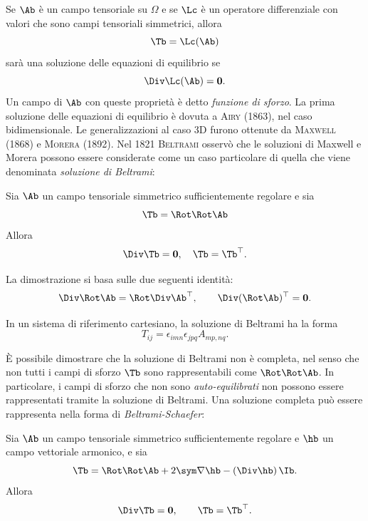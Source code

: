 Se $\Ab$ è un campo tensoriale su $\Omega$ e se $\Lc$ è un operatore differenziale con valori che sono campi tensoriali simmetrici, allora
\begin{equation}
	\Tb =\Lc (\Ab)
\end{equation}
sarà una soluzione delle equazioni di equilibrio se 
\begin{equation}
	\Div \Lc(\Ab)=\mathbf{0}.
\end{equation}
Un campo di $\Ab$ con queste proprietà è detto \textit{funzione di sforzo}. La prima soluzione delle equazioni di equilibrio è dovuta a \textsc{Airy} (1863), nel caso bidimensionale. Le generalizzazioni al caso 3D furono ottenute da \textsc{Maxwell} (1868) e \textsc{Morera} (1892). Nel 1821 \textsc{Beltrami} osservò che le soluzioni di Maxwell e Morera possono essere considerate come un caso particolare di quella che viene denominata \textit{soluzione di Beltrami}:

\begin{definition}
Sia $\Ab$ un campo tensoriale simmetrico sufficientemente regolare e sia
\begin{equation}
\Tb =\Rot \Rot \Ab
\end{equation}
Allora 
\begin{equation}
\Div \Tb =\mathbf{0}, \quad \Tb=\Tb^\top.
\end{equation}
\end{definition}

La dimostrazione si basa sulle due seguenti identità:
\begin{equation}
\Div \Rot \Ab =\Rot \Div \Ab^\top, \qquad \Div(\Rot \Ab)^\top=\mathbf{0}.
\end{equation}

In un sistema di riferimento cartesiano, la soluzione di Beltrami ha la forma
\begin{equation}
T_{ij}=\epsilon_{imn}\epsilon_{jpq}A_{mp,nq}.
\end{equation}


\begin{remark}
È possibile dimostrare che la soluzione di Beltrami non è completa, nel senso che non tutti i campi di sforzo $\Tb$ sono rappresentabili come $\Rot \Rot \Ab$. In particolare, i campi di sforzo che non sono \textit{auto-equilibrati} non possono essere rappresentati tramite la soluzione di Beltrami. Una soluzione completa può essere rappresenta nella forma di \textit{Beltrami-Schaefer}:
\begin{definition}
	Sia $\Ab$ un campo tensoriale simmetrico sufficientemente regolare e $\hb$ un campo vettoriale armonico, e sia
	\begin{equation}
		\Tb = \Rot \Rot \Ab +2 \sym \nabla \hb -(\Div \hb)\,\Ib.
	\end{equation}
	Allora
	\begin{equation}
		\Div \Tb= \mathbf{0}, \qquad \Tb =\Tb^\top.
	\end{equation}
\end{definition}
\end{remark}



